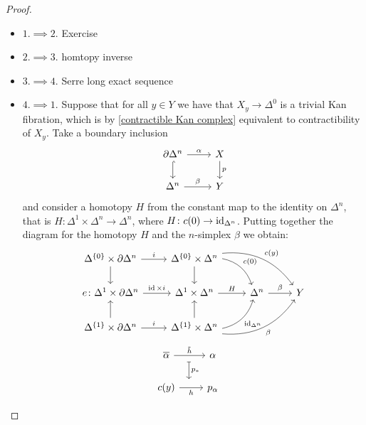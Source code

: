 \begin{proof}
\leavevmode
\begin{itemize}[label={}]
    \item 
    $1. \implies 2.$ Exercise
    \item 
    $2. \implies 3.$ homtopy inverse
    \item 
    $3. \implies 4.$ Serre long exact sequence
    \item 
    $4. \implies 1.$ Suppose that for all $y \in Y$ we have that $X_y \to \Delta^0$ is a trivial Kan fibration, which is by \cref{contractible Kan complex} equivalent to contractibility of $X_y$.
    Take a boundary inclusion 
    \[
    \begin{tikzcd}
        \partial \Delta^n
        \ar[r, "\alpha"]
        \ar[d, hook]
        &
        X
        \ar[d, "p"]
        \\
        \Delta^n 
        \ar[r, "\beta"]
        &
        Y
    \end{tikzcd}
    \]
    and consider a homotopy $H$ from the constant map to the identity on $\Delta^n$, that is $H \colon \Delta^1 \times \Delta^n \to \Delta^n$, where $H\colon c(0) \to \operatorname{id}_{\Delta^n}$.
    Putting together the diagram for the homotopy $H$ and the $n$-simplex $\beta$ we obtain:
    \[
    \begin{tikzcd}
        \Delta^{\{0\}} \times \partial \Delta^n
        \ar[r, "i"]
        \ar[d]
        &
        \Delta^{\{0\}} \times \Delta^n
        \ar[d]
        \ar[rd, bend left, "c(0)"]
        \ar[rrd,bend left, "c(y)"]
        \\
        e\colon\Delta^1 \times \partial \Delta^n
        \ar[r, "\id \times i"]
        &
        \Delta^1 \times \Delta^n
        \ar[r, "H"]
        &
        \Delta^n
        \ar[r, "\beta"]
        &
        Y
        \\
        \Delta^{\{1\}} \times \partial \Delta^n
        \ar[u]
        \ar[r, "i"]
        &
        \Delta^{\{1\}} \times \Delta^n
        \ar[u]
        \ar[ru, bend right, "\id_{\Delta^n}"'] 
        \ar[rru, bend right, "\beta"']
    \end{tikzcd}
    \]
    \[
    \begin{tikzcd}
    	\overline{\alpha}
    	\ar[r, "\Tilde{h}"]
    	\ar[d, mapsto,shift left=0.8cm, "p_*"]
    	&
    	\alpha
    	\\
    	c(y)
    	\ar[r, "h"']
    	&
    	p_{\alpha}
    \end{tikzcd}
	\quad
	\begin{tikzcd}

\end{tikzcd}\]
\end{itemize}
\end{proof}
